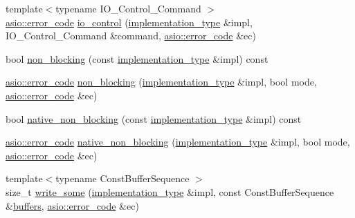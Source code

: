 \begin{DoxyCompactItemize}
\item 
{\footnotesize template$<$typename I\+O\+\_\+\+Control\+\_\+\+Command $>$ }\\\hyperlink{classasio_1_1error__code}{asio\+::error\+\_\+code} \hyperlink{classasio_1_1detail_1_1reactive__descriptor__service_ad705635c2b0b4012bb694a94b69468c1}{io\+\_\+control} (\hyperlink{classasio_1_1detail_1_1reactive__descriptor__service_1_1implementation__type}{implementation\+\_\+type} \&impl, I\+O\+\_\+\+Control\+\_\+\+Command \&command, \hyperlink{classasio_1_1error__code}{asio\+::error\+\_\+code} \&ec)
\item 
bool \hyperlink{classasio_1_1detail_1_1reactive__descriptor__service_a2e488555938b3096dc19cf51d2bbbd54}{non\+\_\+blocking} (const \hyperlink{classasio_1_1detail_1_1reactive__descriptor__service_1_1implementation__type}{implementation\+\_\+type} \&impl) const 
\item 
\hyperlink{classasio_1_1error__code}{asio\+::error\+\_\+code} \hyperlink{classasio_1_1detail_1_1reactive__descriptor__service_a582434b5002b240f64abe2f92d01b7c2}{non\+\_\+blocking} (\hyperlink{classasio_1_1detail_1_1reactive__descriptor__service_1_1implementation__type}{implementation\+\_\+type} \&impl, bool mode, \hyperlink{classasio_1_1error__code}{asio\+::error\+\_\+code} \&ec)
\item 
bool \hyperlink{classasio_1_1detail_1_1reactive__descriptor__service_afdee8ef5d5669474ceb8ae90fd18d25b}{native\+\_\+non\+\_\+blocking} (const \hyperlink{classasio_1_1detail_1_1reactive__descriptor__service_1_1implementation__type}{implementation\+\_\+type} \&impl) const 
\item 
\hyperlink{classasio_1_1error__code}{asio\+::error\+\_\+code} \hyperlink{classasio_1_1detail_1_1reactive__descriptor__service_abbbc0a600b1d2e05b950c62dee4c9da1}{native\+\_\+non\+\_\+blocking} (\hyperlink{classasio_1_1detail_1_1reactive__descriptor__service_1_1implementation__type}{implementation\+\_\+type} \&impl, bool mode, \hyperlink{classasio_1_1error__code}{asio\+::error\+\_\+code} \&ec)
\item 
{\footnotesize template$<$typename Const\+Buffer\+Sequence $>$ }\\size\+\_\+t \hyperlink{classasio_1_1detail_1_1reactive__descriptor__service_a57e370c96bcb115aa45875ccf1edfb7f}{write\+\_\+some} (\hyperlink{classasio_1_1detail_1_1reactive__descriptor__service_1_1implementation__type}{implementation\+\_\+type} \&impl, const Const\+Buffer\+Sequence \&\hyperlink{group__async__read_ga54dede45c3175148a77fe6635222c47d}{buffers}, \hyperlink{classasio_1_1error__code}{asio\+::error\+\_\+code} \&ec)

\end{DoxyCompactItemize}

